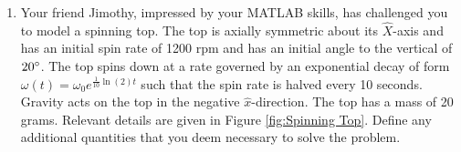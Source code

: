 \documentclass[12pt]{report}
\begin{document}
\begin{enumerate}
    \item Your friend Jimothy, impressed by your MATLAB skills, has challenged you to model a spinning top. The top is axially symmetric about its $\hat{X}$-axis and has an initial spin rate of 1200 rpm and has an initial angle to the vertical of $20\degree$. The top spins down at a rate governed by an exponential decay of form $\omega(t)=\omega_0e^{\frac{1}{10}\ln(2)t}$ such that the spin rate is halved every 10 seconds. Gravity acts on the top in the negative $\hat{x}$-direction. The top has a mass of 20 grams. Relevant details are given in Figure \ref{fig:Spinning Top}.
Define any additional quantities that you deem necessary to solve the problem.

\begin{figure}[ht]
    \centering
    




\begin{tikzpicture}[x=0.75pt,y=0.75pt,yscale=-1,xscale=1]


\end{tikzpicture}
\end{figure}
\end{enumerate}
\end{document}
